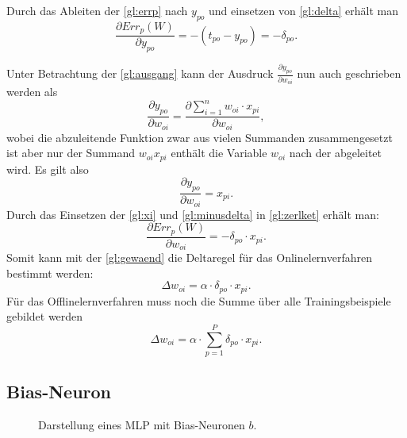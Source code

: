 Durch das Ableiten der \autoref{gl:errp} nach $y_{po}$ und einsetzen von \autoref{gl:delta} erhält man
\begin{equation}
\frac{\partial Err_p(W)}{\partial y_{po}} = -(t_{po}-y_{po}) = - \delta_{po} .
\label{gl:minusdelta}
\end{equation}

Unter Betrachtung der \autoref{gl:ausgang} kann der Ausdruck $ \frac{\partial y_{po}}{\partial w_{oi}}$ nun auch geschrieben werden als 
\begin{equation}
\frac{\partial y_{po}}{\partial w_{oi}} = \frac{\partial \sum\limits_{i=1}^n w_{oi} \cdot x_{pi}}{\partial w_{oi}} ,
\label{gl:vor_xi}
\end{equation}
wobei die abzuleitende Funktion zwar aus vielen Summanden zusammengesetzt ist aber nur der Summand $w_{oi} x_{pi}$ enthält die Variable $w_{oi}$ nach der abgeleitet wird. Es gilt also
\begin{equation}
\frac{\partial y_{po}}{\partial w_{oi}} = x_{pi}.
\label{gl:xi}
\end{equation}
Durch das Einsetzen der \autoref{gl:xi} und \autoref{gl:minusdelta} in \autoref{gl:zerlket} erhält man:
\begin{equation}
\frac{\partial Err_p(W)}{\partial w_{oi}}= - \delta_{po} \cdot x_{pi}.
\label{gl:ze}
\end{equation}
Somit kann mit der \autoref{gl:gewaend} die Deltaregel für das Onlinelernverfahren bestimmt werden:
\begin{equation}
\Delta w_{oi} = \alpha \cdot \delta_{po} \cdot x_{pi} .
\label{gl:fertig_delta}
\end{equation}
Für das Offlinelernverfahren muss noch die Summe über alle Trainingsbeispiele gebildet werden
\begin{equation}
\Delta w_{oi} = \alpha \cdot \sum^P_{p=1} \delta_{po} \cdot x_{pi} .
\end{equation}




\subsection{Bias-Neuron}\label{sec:biasneuron}

\begin{figure}[!htb]
    \centering
        
    \caption[MLP mit Bias-Neuronen]{Darstellung eines MLP mit Bias-Neuronen $b$.}
    \label{fig:biasneuron}
\end{figure}

